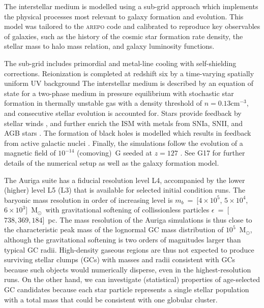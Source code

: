 \documentclass[a4paper,fleqn,usenatbib]{mnras}
\newcommand{\Sun}[0]{\ensuremath{_{\odot}}}
\begin{document}
The interstellar medium is modelled using a sub-grid approach which implements
the physical processes most relevant to galaxy formation and evolution.
This model was tailored to the \textsc{arepo} code and calibrated to reproduce
key observables of galaxies, such as the history of the cosmic star formation rate
density, the stellar mass to halo mass relation, and galaxy luminosity functions.

The sub-grid includes primordial and metal-line cooling with self-shielding
corrections. Reionization is completed at redshift six by a time-varying
spatially uniform UV background \citep{2009ApJ...703.1416F, 2013MNRAS.436.3031V}
The interstellar medium is described by an equation of state for a two-phase medium
in pressure equilibrium \citep{2003MNRAS.339..289S} with stochastic star formation
in thermally unstable gas with a density threshold of $n = 0.13 \text{cm}^{-3}$,
and consecutive stellar evolution is accounted for. Stars provide feedback by
stellar winds \citep{2014MNRAS.437.1750M, 2017MNRAS.467..179G}, and further
enrich the ISM with metals from SNIa, SNII, and AGB stars \citep{2013MNRAS.436.3031V}.
The formation of black holes is modelled which results in feedback from active
galactic nuclei \citep{2005MNRAS.361..776S, 2014MNRAS.437.1750M, 2017MNRAS.467..179G}.
Finally, the simulations follow the evolution of a magnetic field of $10^{-14}$
(comoving)~G seeded at $z = 127$ \citep{2013MNRAS.432..176P, 2014ApJ...783L..20P}.
See G17 for further details of the numerical setup as well as the galaxy formation
model.

The Auriga suite has a fiducial resolution level L4, accompanied by the lower
(higher) level L5 (L3) that is available for selected initial condition runs.
The baryonic mass resolution in order of increasing level is $m_b$~=~[$4 \times 10^5$,
$5 \times 10^4$, $6 \times 10^3$]~M\Sun \, with gravitational softening of
collissionless particles $\epsilon$~=~[$738, 369, 184$]~pc. The mass resolution
of the Auriga simulations is thus close to the characteristic peak mass of the
lognormal GC mass distribution of $10^{5}$~M\Sun \citep{1991ARA&A..29..543H},
although the gravitational softening is two orders of magnitudes larger than
typical GC radii. High-density gaseous regions are thus not expected to produce
surviving stellar clumps (GCs) with masses and radii consistent with GCs because
such objects would numerically disperse, even in the highest-resolution runs.
On the other hand, we can investigate (statistical) properties of age-selected
GC candidates because each star particle represents a single stellar population
with a total mass that could be consistent with one globular cluster.
\end{document}

